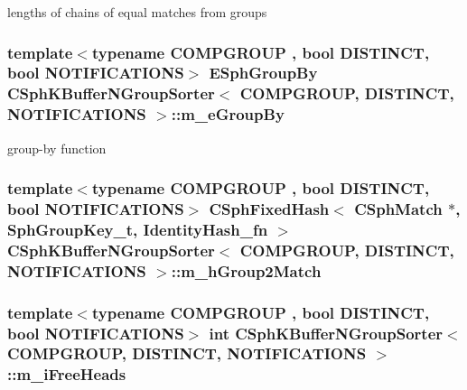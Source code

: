 lengths of chains of equal matches from groups 

\hypertarget{classCSphKBufferNGroupSorter_a41ad1421d5960fe4701ab2b9d5d93fa9}{
\subsubsection[{m\-\_\-e\-Group\-By}]{\setlength{\rightskip}{0pt plus 5cm}template$<$typename C\-O\-M\-P\-G\-R\-O\-U\-P , bool D\-I\-S\-T\-I\-N\-C\-T, bool N\-O\-T\-I\-F\-I\-C\-A\-T\-I\-O\-N\-S$>$ {\bf E\-Sph\-Group\-By} {\bf C\-Sph\-K\-Buffer\-N\-Group\-Sorter}$<$ C\-O\-M\-P\-G\-R\-O\-U\-P, D\-I\-S\-T\-I\-N\-C\-T, N\-O\-T\-I\-F\-I\-C\-A\-T\-I\-O\-N\-S $>$\-::m\-\_\-e\-Group\-By\hspace{0.3cm}{\ttfamily [protected]}}}\label{classCSphKBufferNGroupSorter_a41ad1421d5960fe4701ab2b9d5d93fa9}


group-\/by function 

\hypertarget{classCSphKBufferNGroupSorter_a9b407b13fcdbd6a922effa1748ae5049}{
\subsubsection[{m\-\_\-h\-Group2\-Match}]{\setlength{\rightskip}{0pt plus 5cm}template$<$typename C\-O\-M\-P\-G\-R\-O\-U\-P , bool D\-I\-S\-T\-I\-N\-C\-T, bool N\-O\-T\-I\-F\-I\-C\-A\-T\-I\-O\-N\-S$>$ {\bf C\-Sph\-Fixed\-Hash}$<$ {\bf C\-Sph\-Match} $\ast$, {\bf Sph\-Group\-Key\-\_\-t}, {\bf Identity\-Hash\-\_\-fn} $>$ {\bf C\-Sph\-K\-Buffer\-N\-Group\-Sorter}$<$ C\-O\-M\-P\-G\-R\-O\-U\-P, D\-I\-S\-T\-I\-N\-C\-T, N\-O\-T\-I\-F\-I\-C\-A\-T\-I\-O\-N\-S $>$\-::m\-\_\-h\-Group2\-Match\hspace{0.3cm}{\ttfamily [protected]}}}\label{classCSphKBufferNGroupSorter_a9b407b13fcdbd6a922effa1748ae5049}
\hypertarget{classCSphKBufferNGroupSorter_ae16566a58aee6eb3e75a492bade7ceaf}{
\subsubsection[{m\-\_\-i\-Free\-Heads}]{\setlength{\rightskip}{0pt plus 5cm}template$<$typename C\-O\-M\-P\-G\-R\-O\-U\-P , bool D\-I\-S\-T\-I\-N\-C\-T, bool N\-O\-T\-I\-F\-I\-C\-A\-T\-I\-O\-N\-S$>$ {\bf int} {\bf C\-Sph\-K\-Buffer\-N\-Group\-Sorter}$<$ C\-O\-M\-P\-G\-R\-O\-U\-P, D\-I\-S\-T\-I\-N\-C\-T, N\-O\-T\-I\-F\-I\-C\-A\-T\-I\-O\-N\-S $>$\-::m\-\_\-i\-Free\-Heads\hspace{0.3cm}{\ttfamily [protected]}}}\label{classCSphKBufferNGroupSorter_ae16566a58aee6eb3e75a492bade7ceaf}



